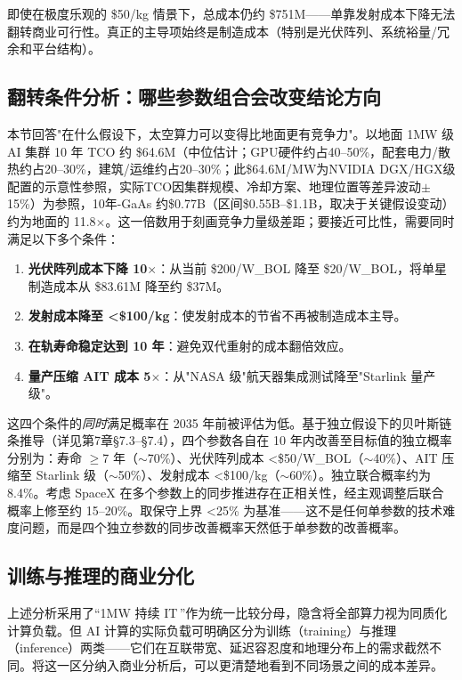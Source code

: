 即使在极度乐观的 \$50/kg 情景下，总成本仍约 \$751M——单靠发射成本下降无法翻转商业可行性。真正的主导项始终是制造成本（特别是光伏阵列、系统裕量/冗余和平台结构）。

\subsection{翻转条件分析：哪些参数组合会改变结论方向}

本节回答"在什么假设下，太空算力可以变得比地面更有竞争力"。以地面 1\;MW 级 AI 集群 10 年 TCO 约 \$64.6M（中位估计；GPU硬件约占40--50\%，配套电力/散热约占20--30\%，建筑/运维约占20--30\%；此\$64.6M/MW为NVIDIA DGX/HGX级配置的示意性参照，实际TCO因集群规模、冷却方案、地理位置等差异波动$\pm$15\%）为参照，10年-GaAs 约\$0.77B（区间\$0.55B--\$1.1B，取决于关键假设变动）约为地面的 11.8$\times$。这一倍数用于刻画竞争力量级差距；要接近可比性，需要同时满足以下多个条件：

\begin{enumerate}[leftmargin=*]
    \item \textbf{光伏阵列成本下降 10$\times$}：从当前 \$200/W\_BOL 降至 \$20/W\_BOL，将单星制造成本从 \$83.61M 降至约 \$37M。
    \item \textbf{发射成本降至 <\$100/kg}：使发射成本的节省不再被制造成本主导。
    \item \textbf{在轨寿命稳定达到 10 年}：避免双代重射的成本翻倍效应。
    \item \textbf{量产压缩 AIT 成本 5$\times$}：从"NASA 级"航天器集成测试降至"Starlink 量产级"。
\end{enumerate}

这四个条件的\emph{同时}满足概率在 2035 年前被评估为低。基于独立假设下的贝叶斯链条推导（详见第7章\;\S 7.3--\S 7.4），四个参数各自在 10 年内改善至目标值的独立概率分别为：寿命 $\geq$7 年（$\sim$70\%）、光伏阵列成本 <\$50/W\_BOL（$\sim$40\%）、AIT 压缩至 Starlink 级（$\sim$50\%）、发射成本 <\$100/kg（$\sim$60\%）。独立联合概率约为 8.4\%。考虑 SpaceX 在多个参数上的同步推进存在正相关性，经主观调整后联合概率上修至约 15--20\%。取保守上界 <25\% 为基准——这不是任何单参数的技术难度问题，而是四个独立参数的同步改善概率天然低于单参数的改善概率。

\subsection{训练与推理的商业分化}

上述分析采用了“1\;MW 持续 IT\,”作为统一比较分母，隐含将全部算力视为同质化计算负载。但 AI 计算的实际负载可明确区分为训练（training）与推理（inference）两类——它们在互联带宽、延迟容忍度和地理分布上的需求截然不同。将这一区分纳入商业分析后，可以更清楚地看到不同场景之间的成本差异。

